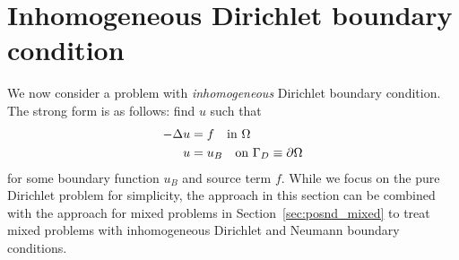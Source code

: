 

\section{Inhomogeneous Dirichlet boundary condition}
We now consider a problem with \emph{inhomogeneous} Dirichlet boundary condition.  The strong form is as follows: find $u$ such that
\begin{align}
  -\Delta u &= f \quad \text{in } \Omega \label{eq:posnd_inhomo_bc_strong} \\
  u &= u_B \quad \text{on } \Gamma_D \equiv \partial \Omega \notag
\end{align}
for some boundary function $u_B$ and source term $f$. While we focus on the pure Dirichlet problem for simplicity, the approach in this section can be combined with the approach for mixed problems in Section~\ref{sec:posnd_mixed} to treat mixed problems with inhomogeneous Dirichlet and Neumann boundary conditions.

